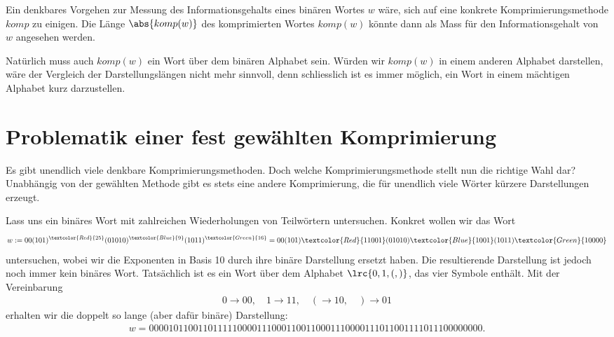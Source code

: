 Ein denkbares Vorgehen zur Messung des Informationsgehalts eines binären Wortes $w$ wäre, sich auf eine konkrete Komprimierungsmethode $komp$ zu einigen.
Die Länge $\abs{komp(w)}$ des komprimierten Wortes $komp(w)$ könnte dann als Mass für den Informationsgehalt von $w$ angesehen werden.
\par
Natürlich muss auch $komp(w)$ ein Wort über dem binären Alphabet sein.
Würden wir $komp(w)$ in einem anderen Alphabet darstellen, wäre der Vergleich der Darstellungslängen nicht mehr sinnvoll, denn schliesslich ist es immer möglich, ein Wort in einem mächtigen Alphabet kurz darzustellen.

\section{Problematik einer fest gewählten Komprimierung}
Es gibt unendlich viele denkbare Komprimierungsmethoden.
Doch welche Komprimierungsmethode stellt nun die richtige Wahl dar? Unabhängig von der gewählten Methode gibt es stets eine andere Komprimierung, die für unendlich viele Wörter kürzere Darstellungen erzeugt.

\begin{myexample}\label{myexample:Wiederholungen}
Lass uns ein binäres Wort mit zahlreichen Wiederholungen von Teilwörtern untersuchen. Konkret wollen wir das Wort
\begin{align*}
	w := 00(101)^{\textcolor{Red}{25}}(01010)^{\textcolor{Blue}{9}}(1011)^{\textcolor{Green}{16}} = 00(101)\textcolor{Red}{11001}(01010)\textcolor{Blue}{1001}(1011)\textcolor{Green}{10000}
\end{align*}
untersuchen, wobei wir die Exponenten in Basis 10 durch ihre binäre Darstellung ersetzt haben. Die resultierende Darstellung ist jedoch noch immer kein binäres Wort. Tatsächlich ist es ein Wort über dem Alphabet $\lrc{0, 1, (, )}$, das vier Symbole enthält. Mit der Vereinbarung
\begin{align*}
	0 \to 00, \quad 1 \to 11, \quad ( \to 10, \quad ) \to 01
\end{align*}
erhalten wir die doppelt so lange (aber dafür binäre) Darstellung:
\begin{align*}
	w = 00001011001101111100001110001100110001110000111011001111011100000000.
\end{align*}
\end{myexample}

